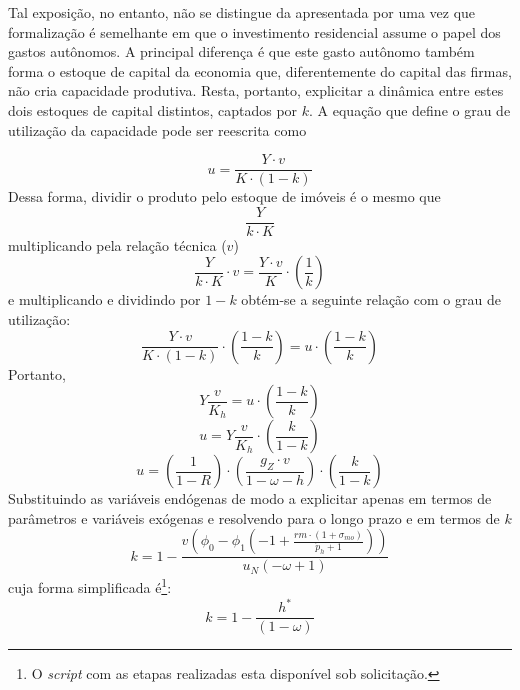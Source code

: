 
Tal exposição, no entanto, não se distingue da apresentada por \textcite{freitas_growth_2015} uma vez que formalização é semelhante em que o investimento residencial assume o papel dos gastos autônomos. A principal diferença é que este gasto autônomo também forma o estoque de capital da economia que, diferentemente do capital das firmas, não cria capacidade produtiva. Resta, portanto, explicitar a dinâmica entre estes dois estoques de capital distintos, captados por $k$. A equação que define o grau de utilização da capacidade pode ser reescrita como

$$
u = \frac{Y\cdot v}{K \cdot (1-k)}
$$
Dessa forma, dividir o produto pelo estoque de imóveis é o mesmo que
$$
\frac{Y}{k\cdot K}
$$
multiplicando pela relação técnica ($v$)
$$
\frac{Y}{k\cdot K}\cdot v = \frac{Y\cdot v}{K}\cdot \left(\frac{1}{k}\right)
$$
e multiplicando e dividindo por $1-k$ obtém-se a seguinte relação com o grau de utilização:
$$
\frac{Y\cdot v}{K\cdot (1-k)}\cdot \left(\frac{1-k}{k}\right) = u \cdot \left(\frac{1-k}{k}\right)
$$
Portanto,
$$
Y\frac{v}{K_h} =  u \cdot \left(\frac{1-k}{k}\right)
$$
$$
u = Y\frac{v}{K_h} \cdot \left(\frac{k}{1-k}\right)
$$
\begin{equation}
u = \left(\frac{1}{1-R}\right)\cdot\left(\frac{g_Z\cdot v}{1-\omega- h}\right)\cdot\left(\frac{k}{1-k}\right)
\end{equation}
Substituindo as variáveis endógenas de modo a explicitar apenas em termos de parâmetros e variáveis exógenas e resolvendo para o longo prazo e em termos de $k$
\begin{equation}
\label{kAnali}
k = 1 - \frac{v \left(\phi_{0} - \phi_{1} \left(-1 + \frac{rm\cdot(1+\sigma_{mo})}{\dot p_h + 1}\right)\right)}{u_N \left(- \omega + 1\right)}
\end{equation}
cuja forma simplificada é\footnote{O \textit{script} com as etapas realizadas esta disponível sob solicitação.}:
$$
k = 1 - \frac{h^*}{(1 - \omega)}
$$

